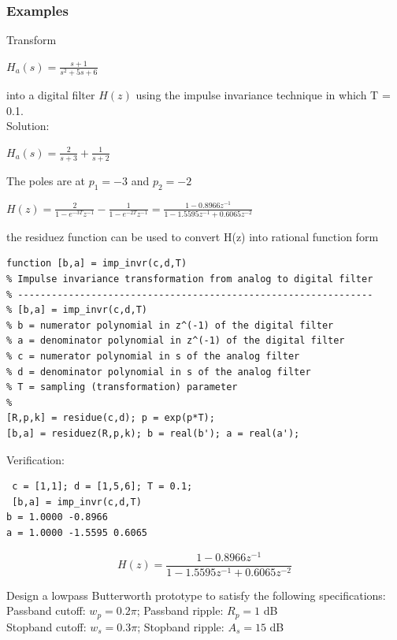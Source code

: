 \documentclass{article}
\begin{document}
\subsubsection{Examples}
Transform 
\begin{center}
$H_a(s) = \frac{s+1}{s^2+5s+6}$
\end{center}
into a digital filter $H(z)$ using the impulse invariance technique in which T = 0.1.\\
\vspace{1em} 
Solution:
\begin{center}
    $H_a(s)=\frac{2}{s+3}+\frac{1}{s+2}$
\end{center}
The poles are at $p_1=-3$ and $p_2=-2$
\begin{center}
    $H(z)=\frac{2}{1-e^{-3T}z^{-1}}-\frac{1}{1-e^{-2T}z^{-1}}=\frac{1-0.8966z^{-1}}{1-1.5595z^{-1}+0.6065z^{-2}}$
\end{center}
the residuez function can be used to convert H(z) into rational function form
\begin{lstlisting}
function [b,a] = imp_invr(c,d,T)
% Impulse invariance transformation from analog to digital filter
% ---------------------------------------------------------------
% [b,a] = imp_invr(c,d,T)
% b = numerator polynomial in z^(-1) of the digital filter
% a = denominator polynomial in z^(-1) of the digital filter
% c = numerator polynomial in s of the analog filter    
% d = denominator polynomial in s of the analog filter
% T = sampling (transformation) parameter
%
[R,p,k] = residue(c,d); p = exp(p*T);
[b,a] = residuez(R,p,k); b = real(b'); a = real(a');
\end{lstlisting}
Verification:
\begin{lstlisting}
 c = [1,1]; d = [1,5,6]; T = 0.1;
 [b,a] = imp_invr(c,d,T)
b = 1.0000 -0.8966
a = 1.0000 -1.5595 0.6065    
\end{lstlisting}
\begin{center}
$$H(z) = \frac{1-0.8966z^{-1}}{1-1.5595z^{-1}+0.6065z^{-2}}$$
\end{center}
Design a lowpass Butterworth prototype to satisfy the following specifications: \\
\vspace{1em}
Passband cutoff: $w_p=0.2\pi$; Passband ripple: $R_p=1$ dB \\
\vspace{1em}
Stopband cutoff: $w_s=0.3\pi$; Stopband ripple: $A_s =15$ dB \\
\vspace{1em}
\end{document}
